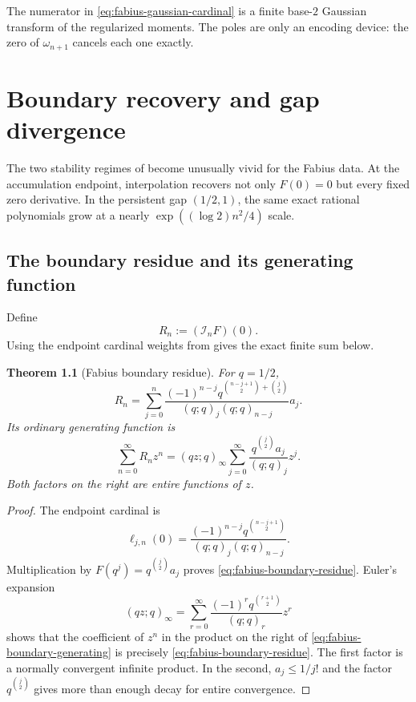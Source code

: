 \documentclass[11pt,oneside]{book}
\numberwithin{equation}{chapter}
\newtheorem{theorem}{Theorem}[chapter]
\theoremstyle{definition}
\theoremstyle{remark}
\newcommand{\Interp}{\mathcal I}
\begin{document}
The numerator in \eqref{eq:fabius-gaussian-cardinal} is a finite base-$2$
Gaussian transform of the regularized moments.  The poles are only an
encoding device: the zero of $\omega_{n+1}$ cancels each one exactly.

\chapter{Boundary recovery and gap divergence}
\label{chap:fabius-boundary-gap}

The two stability regimes of  become unusually vivid
for the Fabius data.  At the accumulation endpoint, interpolation recovers
not only $F(0)=0$ but every fixed zero derivative.  In the persistent gap
$(1/2,1)$, the same exact rational polynomials grow at a nearly
$\exp((\log2)n^2/4)$ scale.

\section{The boundary residue and its generating function}
\label{sec:fabius-boundary-transform}

Define
\begin{equation}
 R_n:=(\Interp_nF)(0).
 \label{eq:fabius-boundary-residue-definition}
\end{equation}
Using the endpoint cardinal weights from
 gives the exact finite sum below.

\begin{theorem}[Fabius boundary residue]
\label{thm:fabius-boundary-residue}
For $q=1/2$,
\begin{equation}
 \boxed{
 R_n=\sum_{j=0}^{n}
 \frac{(-1)^{n-j}
 q^{\binom{n-j+1}{2}+\binom j2}}
 {(q;q)_j(q;q)_{n-j}}a_j.}
 \label{eq:fabius-boundary-residue}
\end{equation}
Its ordinary generating function is
\begin{equation}
 \boxed{
 \sum_{n=0}^{\infty}R_nz^n
 =(qz;q)_\infty
  \sum_{j=0}^{\infty}
  \frac{q^{\binom j2}a_j}{(q;q)_j}z^j.}
 \label{eq:fabius-boundary-generating}
\end{equation}
Both factors on the right are entire functions of $z$.
\end{theorem}

\begin{proof}
The endpoint cardinal is
\[
 \ell_{j,n}(0)
 =\frac{(-1)^{n-j}q^{\binom{n-j+1}{2}}}
 {(q;q)_j(q;q)_{n-j}}.
\]
Multiplication by $F(q^j)=q^{\binom j2}a_j$ proves
\eqref{eq:fabius-boundary-residue}.  Euler's expansion
\[
 (qz;q)_\infty
 =\sum_{r=0}^{\infty}
   \frac{(-1)^rq^{\binom{r+1}{2}}}{(q;q)_r}z^r
\]
shows that the coefficient of $z^n$ in the product on the right of
\eqref{eq:fabius-boundary-generating} is precisely
\eqref{eq:fabius-boundary-residue}.  The first factor is a normally
convergent infinite product.  In the second, $a_j\le1/j!$ and the factor
$q^{\binom j2}$ gives more than enough decay for entire convergence.
\end{proof}
\end{document}
